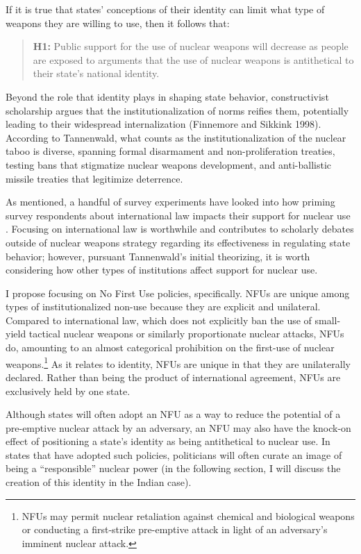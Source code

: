 \documentclass[12pt]{article}
\begin{document}
If it is true that states' conceptions of their identity can limit what type of weapons they are willing to use, then it follows that:

\begin{quote}
\textbf{H1:} Public support for the use of nuclear weapons will decrease as people are exposed to arguments that the use of nuclear weapons is antithetical to their state's national identity.
\end{quote}

Beyond the role that identity plays in shaping state behavior, constructivist scholarship argues that the institutionalization of norms reifies them, potentially leading to their widespread internalization (Finnemore and Sikkink 1998). According to Tannenwald, what counts as the institutionalization of the nuclear taboo is diverse, spanning formal disarmament and non-proliferation treaties, testing bans that stigmatize nuclear weapons development, and anti-ballistic missile treaties that legitimize deterrence. 

As mentioned, a handful of survey experiments have looked into how priming survey respondents about international law impacts their support for nuclear use \citep{carpenter_stopping_2020, sagan_does_2020, sagan_atomic_2024}.  Focusing on international law is worthwhile and contributes to scholarly debates outside of nuclear weapons strategy regarding its effectiveness in regulating state behavior; however, pursuant Tannenwald's initial theorizing, it is worth considering how other types of institutions affect support for nuclear use. 

I propose focusing on No First Use policies, specifically. NFUs are unique among types of institutionalized non-use because they are explicit and unilateral. Compared to international law, which does not explicitly ban the use of small-yield tactical nuclear weapons or similarly proportionate nuclear attacks, NFUs do, amounting to an almost categorical prohibition on the first-use of nuclear weapons.\footnote{ NFUs may permit nuclear retaliation against chemical and biological weapons or conducting a first-strike pre-emptive attack in light of an adversary's imminent nuclear attack.} As it relates to identity, NFUs are unique in that they are unilaterally declared. Rather than being the product of international agreement, NFUs are exclusively held by one state. 

Although states will often adopt an NFU as a way to reduce the potential of a pre-emptive nuclear attack by an adversary, an NFU may also have the knock-on effect of positioning a state's identity as being antithetical to nuclear use. In states that have adopted such policies, politicians will often curate an image of being a “responsible” nuclear power (in the following section, I will discuss the creation of this identity in the Indian case). 
\end{document}
